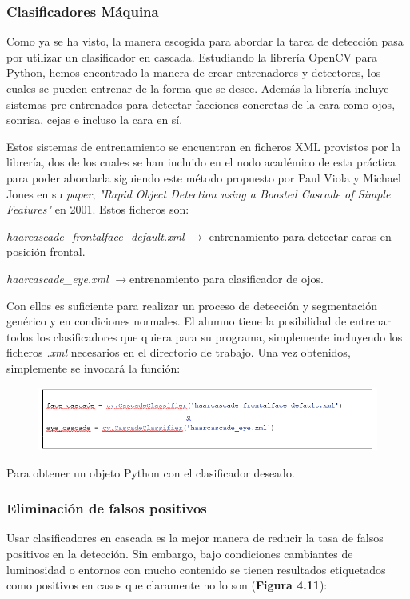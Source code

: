 \subsubsection{Clasificadores Máquina}
Como ya se ha visto, la manera escogida para abordar la tarea de detección pasa por utilizar un clasificador en cascada. 
Estudiando la librería OpenCV para Python, hemos encontrado la manera de crear entrenadores y detectores, los cuales se pueden entrenar de la forma que se desee. Además la librería incluye sistemas pre-entrenados para detectar facciones concretas de la cara como ojos, sonrisa, cejas e incluso la cara en sí.

Estos sistemas de entrenamiento se encuentran en ficheros XML provistos por la librería, dos de los cuales se han incluido en el nodo académico de esta práctica para poder abordarla siguiendo este método propuesto por  Paul Viola y Michael Jones en su \textit{paper}, \textit{"Rapid Object Detection using a Boosted Cascade of Simple Features"} en 2001. Estos ficheros son:

\textit{haarcascade\_frontalface\_default.xml} $\rightarrow$ entrenamiento para detectar caras en posición frontal.

\textit{haarcascade\_eye.xml} $\rightarrow$entrenamiento para clasificador de ojos.

Con ellos es suficiente para realizar un proceso de detección y segmentación genérico y en condiciones normales. El alumno tiene la posibilidad de entrenar todos los clasificadores que quiera para su programa, simplemente incluyendo los ficheros \textit{.xml} necesarios en el directorio de trabajo. Una vez obtenidos, simplemente se invocará la función:

\begin{figure}[H]
  \begin{center}
    \includegraphics[width=0.99\linewidth]{figures/classifiercode.png}
		\label{fig.classifiercode}
		\end{center}
\end{figure}
Para obtener un objeto Python con el clasificador deseado.

\subsubsection{Eliminación de falsos positivos}
Usar clasificadores en cascada es la mejor manera de reducir la tasa de falsos positivos en la detección. Sin embargo, bajo condiciones cambiantes de luminosidad o entornos con mucho contenido se tienen resultados etiquetados como positivos en casos que claramente no lo son (\textbf{Figura 4.11}):

